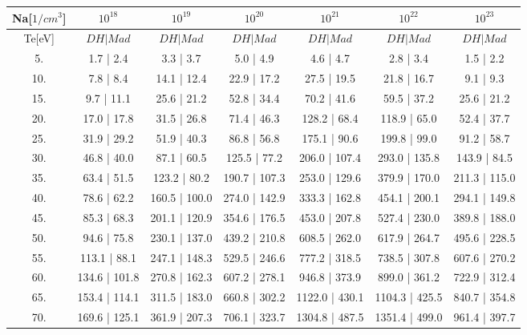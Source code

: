 \begin{tabular}{|c||c|c|c|c|c|c|}
\hline
Na[$1/cm^3$] & $10^{18}$ & $10^{19}$ & $10^{20}$ & $10^{21}$ & $10^{22}$ & $10^{23}$\tabularnewline
\hline
Te[eV] & $DH | Mad$ & $DH | Mad$ & $DH | Mad$ & $DH | Mad$ & $DH | Mad$ & $DH | Mad$\tabularnewline
\hline
\hline
   5. &      1.7 |     2.4 &      3.3 |     3.7 &      5.0 |     4.9 &      4.6 |     4.7 &      2.8 |     3.4 &      1.5 |     2.2\tabularnewline
\hline
  10. &      7.8 |     8.4 &     14.1 |    12.4 &     22.9 |    17.2 &     27.5 |    19.5 &     21.8 |    16.7 &      9.1 |     9.3\tabularnewline
\hline
  15. &      9.7 |    11.1 &     25.6 |    21.2 &     52.8 |    34.4 &     70.2 |    41.6 &     59.5 |    37.2 &     25.6 |    21.2\tabularnewline
\hline
  20. &     17.0 |    17.8 &     31.5 |    26.8 &     71.4 |    46.3 &    128.2 |    68.4 &    118.9 |    65.0 &     52.4 |    37.7\tabularnewline
\hline
  25. &     31.9 |    29.2 &     51.9 |    40.3 &     86.8 |    56.8 &    175.1 |    90.6 &    199.8 |    99.0 &     91.2 |    58.7\tabularnewline
\hline
  30. &     46.8 |    40.0 &     87.1 |    60.5 &    125.5 |    77.2 &    206.0 |   107.4 &    293.0 |   135.8 &    143.9 |    84.5\tabularnewline
\hline
  35. &     63.4 |    51.5 &    123.2 |    80.2 &    190.7 |   107.3 &    253.0 |   129.6 &    379.9 |   170.0 &    211.3 |   115.0\tabularnewline
\hline
  40. &     78.6 |    62.2 &    160.5 |   100.0 &    274.0 |   142.9 &    333.3 |   162.8 &    454.1 |   200.1 &    294.1 |   149.8\tabularnewline
\hline
  45. &     85.3 |    68.3 &    201.1 |   120.9 &    354.6 |   176.5 &    453.0 |   207.8 &    527.4 |   230.0 &    389.8 |   188.0\tabularnewline
\hline
  50. &     94.6 |    75.8 &    230.1 |   137.0 &    439.2 |   210.8 &    608.5 |   262.0 &    617.9 |   264.7 &    495.6 |   228.5\tabularnewline
\hline
  55. &    113.1 |    88.1 &    247.1 |   148.3 &    529.5 |   246.6 &    777.2 |   318.5 &    738.5 |   307.8 &    607.6 |   270.2\tabularnewline
\hline
  60. &    134.6 |   101.8 &    270.8 |   162.3 &    607.2 |   278.1 &    946.8 |   373.9 &    899.0 |   361.2 &    722.9 |   312.4\tabularnewline
\hline
  65. &    153.4 |   114.1 &    311.5 |   183.0 &    660.8 |   302.2 &   1122.0 |   430.1 &   1104.3 |   425.5 &    840.7 |   354.8\tabularnewline
\hline
  70. &    169.6 |   125.1 &    361.9 |   207.3 &    706.1 |   323.7 &   1304.8 |   487.5 &   1351.4 |   499.0 &    961.4 |   397.7\tabularnewline

\end{tabular}
